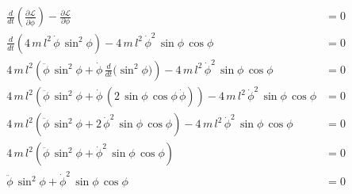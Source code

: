 \begin{align}
    \frac{d}{dt} \left(\frac{\partial \mathcal{L}}{\partial \dot{\phi}}\right)
    - \frac{\partial \mathcal{L}}{\partial \phi}
    &= 0 \\
    \frac{d}{dt} \left(4\,m\,l^{2}\,\dot{\phi}\,\sin^{2}\phi\right)
    - 4\,m\,l^{2}\,\dot{\phi}^{2}\,\sin\phi\,\cos\phi
    &= 0 \\
    4\,m\,l^{2} \left(\ddot{\phi}\,\sin^{2}\phi 
    + \dot{\phi}\,\frac{d}{dt}\!\bigl(\sin^{2}\phi\bigr)\right)
    - 4\,m\,l^{2}\,\dot{\phi}^{2}\,\sin\phi\,\cos\phi
    &= 0 \\
    4\,m\,l^{2} \left(\ddot{\phi}\,\sin^{2}\phi 
    + \dot{\phi}\,\left(2\,\sin\phi\,\cos\phi\,\dot{\phi}\right)\right)
    - 4\,m\,l^{2}\,\dot{\phi}^{2}\,\sin\phi\,\cos\phi
    &= 0 \\
    4\,m\,l^{2} \left(\ddot{\phi}\,\sin^{2}\phi 
    + 2\,\dot{\phi}^{2}\,\sin\phi\,\cos\phi\right)
    - 4\,m\,l^{2}\,\dot{\phi}^{2}\,\sin\phi\,\cos\phi
    &= 0 \\
    4\,m\,l^{2} \left(\ddot{\phi}\,\sin^{2}\phi 
    + \dot{\phi}^{2}\,\sin\phi\,\cos\phi\right)
    &= 0 \\
    \ddot{\phi}\,\sin^{2}\phi 
    + \dot{\phi}^{2}\,\sin\phi\,\cos\phi 
    &= 0
\end{align}
